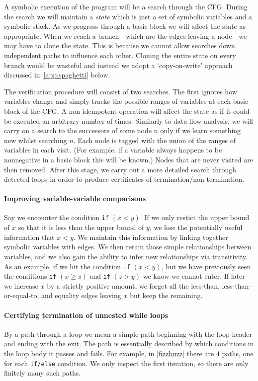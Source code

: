 \documentclass[12pt,a4paper]{article}
\begin{document}
A symbolic execution of the program will be a search through the CFG. During the search we will maintain a \textit{state} which is just a set of symbolic variables and a symbolic stack. As we progress through a basic block we will affect the state as appropriate. 
When we reach a branch - which are the edges leaving a node - we may have to clone the state. This is because we cannot allow searches down independent paths to influence each other. Cloning the entire state on every branch would be wasteful and instead we adopt a `copy-on-write' approach discussed in~\cref{app:spaghetti} below.

The verification procedure will consist of two searches. The first ignores how variables change and simply tracks the possible ranges of variables at each basic block of the CFG. A non-idempotent operation will affect the state as if it could be executed an arbitrary number of times. Similarly to data-flow analysis, we will carry on a search to the successors of some node $n$ only if we learn something new whilst searching $n$. Each node is tagged with the union of the ranges of variables in each visit. (For example, if a variable always happens to be nonnegative in a basic block this will be known.) Nodes that are never visited are then removed. After this stage, we carry out a more detailed
search through detected loops in order to produce certificates of termination/non-termination.

\paragraph{Improving variable-variable comparisons}
Say we encounter the condition \texttt{if} $(x < y)$. If we only restict the upper bound of $x$ so that it is less than the upper bound of $y$, we lose the potentially useful information that $x < y$.
We maintain this information by linking together symbolic variables with edges. We then retain those simple relationships between variables, and we also gain the ability to infer new relationships via transitivity.
As an example, if we hit the condition \texttt{if} $(x < y)$, but we have previously seen the conditions \texttt{if} $(x \geq z)$ and \texttt{if} $(z > y)$ we know we cannot enter.
If later we increase $x$ by a strictly positive amount, we forget all the less-than, less-than-or-equal-to, and equality edges leaving $x$ but keep the remaining.

\paragraph{Certifying termination of unnested while loops}\label{par:loops}
By a path through a loop we mean a simple path beginning with the loop header and ending with the exit. The path is essentially described by which conditions
in the loop body it passes and fails. For example, in \cref{fizzbuzz} there are $4$ paths, one for each \texttt{if/else} condition. We only inspect the first iteration, so there are only finitely many such paths.
\end{document}
